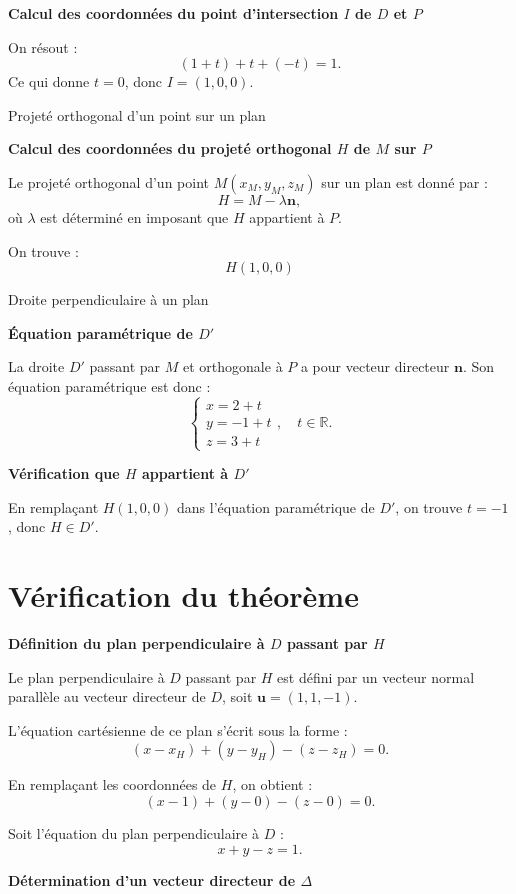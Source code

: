 \documentclass[10pt,a4paper]{article}
\begin{document}
\ql \textbf{Calcul des coordonnées du point d'intersection $I$ de $D$ et $P$}

On résout :
\[
(1+t) + t + (-t) = 1.
\]
Ce qui donne $t = 0$, donc $I = (1, 0, 0)$.

\q Projeté orthogonal d'un point sur un plan
\setcounter{ql}{0}

\ql \textbf{Calcul des coordonnées du projeté orthogonal $H$ de $M$ sur $P$}

Le projeté orthogonal d'un point $M(x_M, y_M, z_M)$ sur un plan est donné par :
\[
H = M - \lambda \mathbf{n},
\]
où $\lambda$ est déterminé en imposant que $H$ appartient à $P$.

On trouve :
\[
H(1, 0, 0)
\]

\q Droite perpendiculaire à un plan
\setcounter{ql}{0}

\ql \textbf{Équation paramétrique de $D'$}

La droite $D'$ passant par $M$ et orthogonale à $P$ a pour vecteur directeur $\mathbf{n}$. Son
équation paramétrique est donc :
\[
\begin{cases}
x = 2 + t \\
y = -1 + t \\
z = 3 + t
\end{cases}, \quad t \in \mathbb{R}.
\]

\ql \textbf{Vérification que $H$ appartient à $D'$}

En remplaçant $H(1,0,0)$ dans l'équation paramétrique de $D'$, on trouve $t = -1$, donc $H \in D'$.



\section{Vérification du théorème}

\q \textbf{Définition du plan perpendiculaire à $D$ passant par $H$}

Le plan perpendiculaire à $D$ passant par $H$ est défini par un vecteur normal parallèle au vecteur directeur de $D$, soit $\mathbf{u} = (1,1,-1)$.

L'équation cartésienne de ce plan s'écrit sous la forme :
\[
(x - x_H) + (y - y_H) - (z - z_H) = 0.
\]

En remplaçant les coordonnées de $H$, on obtient :
\[
(x - 1) + (y - 0) - (z - 0) = 0.
\]

Soit l'équation du plan perpendiculaire à $D$ :
\[
x + y - z = 1.
\]

\q \textbf{Détermination d'un vecteur directeur de $\Delta$}
\end{document}
